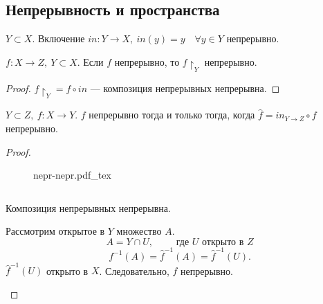 \documentclass[11pt]{book}
\newcommand{\incfig}[1]{%
    \def\svgwidth{\columnwidth}
    {#1.pdf_tex}
}
\theoremstyle{definition}
\theoremstyle{plain}
\theoremstyle{plain}
\theoremstyle{definition}
\theoremstyle{remark}
\begin{document}
\subsection{Непрерывность и пространства}
\begin{thm}
    $ Y \subset X$.
    Включение  $ in: Y \to  X, ~ in(y) = y \quad \forall  y \in Y$ непрерывно.
\end{thm}
\begin{thm}
    $ f: X \to  Z, ~ Y \subset X$.
    Если $ f$ непрерывно, то  $ f\!\upharpoonright_Y$ непрерывно.
\end{thm}
\begin{proof}
    $ f\!\upharpoonright_Y = f \circ in$ --- композиция непрерывных непрерывна.
\end{proof}
\begin{thm}
    $ Y \subset  Z, ~ f: X \to  Y$. $ f$ непрерывно  тогда и только тогда, когда  $\hat{f} = in_{Y \to Z} \circ f$ непрерывно.
\end{thm}
\begin{proof}
\begin{figure}[ht]
    \centering
    \incfig{nepr-nepr}
    \label{fig:nepr-nepr}
\end{figure}
$ $
\begin{description}
    \item {} 
	Композиция непрерывных непрерывна.
    \item {} 
	Рассмотрим  открытое в $ Y$ множество $ A$. 
	$$ A = Y \cap U, \qquad \text{ где } U  \text{ открыто в } Z$$  
	\[
	    f^{-1}(A) = \hat{f}^{-1}(A) = \hat{f}^{-1}(U) 
	.\] 
	$ \hat{f}^{-1}(U)$ открыто в $ X$. Следовательно, $ f$ непрерывно.
\end{description} 
\end{proof}
\end{document}
